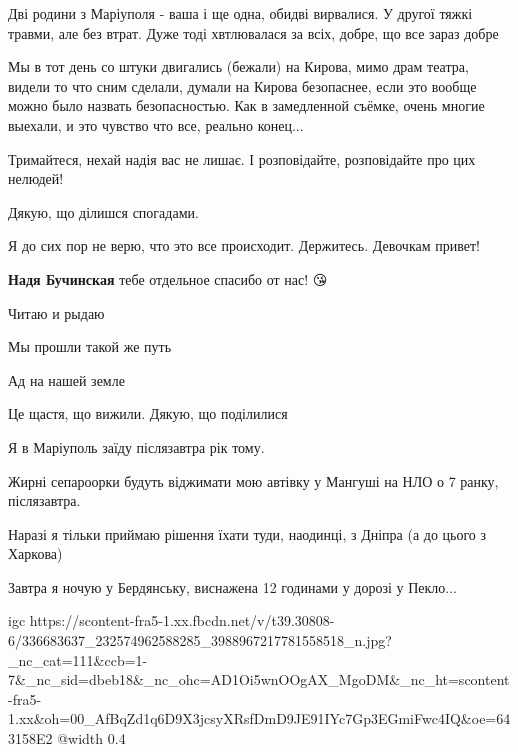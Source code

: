 
Дві родини з Маріуполя - ваша і ще одна, обидві вирвалися. У другої тяжкі
травми, але без втрат. Дуже тоді хвтлювалася за всіх, добре, що все зараз добре


Мы в тот день со штуки двигались (бежали) на Кирова, мимо драм театра, видели
то что сним сделали, думали на Кирова безопаснее, если это вообще можно было
назвать безопасностью. Как в замедленной съёмке, очень многие выехали, и это
чувство что все, реально конец...


Тримайтеся, нехай надія вас не лишає. І розповідайте, розповідайте про цих
нелюдей!


Дякую, що ділишся спогадами.


Я до сих пор не верю, что это все происходит. Держитесь. Девочкам привет!

\begin{itemize} %
\textbf{Надя Бучинская} тебе отдельное спасибо от нас! 😘
\end{itemize} %


Читаю и рыдаю

Мы прошли такой же путь

Ад на нашей земле


Це щастя, що вижили. Дякую, що поділилися


Я в Маріуполь заїду післязавтра рік тому.

Жирні сепароорки будуть віджимати мою автівку у Мангуші на НЛО о 7 ранку,
післязавтра.

Наразі я тільки приймаю рішення їхати туди, наодинці, з Дніпра (а до цього з
Харкова)

Завтра я ночую у Бердянську, виснажена 12 годинами у дорозі у Пекло...

\ifcmt
  igc https://scontent-fra5-1.xx.fbcdn.net/v/t39.30808-6/336683637_232574962588285_3988967217781558518_n.jpg?_nc_cat=111&ccb=1-7&_nc_sid=dbeb18&_nc_ohc=AD1Oi5wnOOgAX_MgoDM&_nc_ht=scontent-fra5-1.xx&oh=00_AfBqZd1q6D9X3jcsyXRsfDmD9JE91IYc7Gp3EGmiFwc4IQ&oe=643158E2
	@width 0.4
\fi

